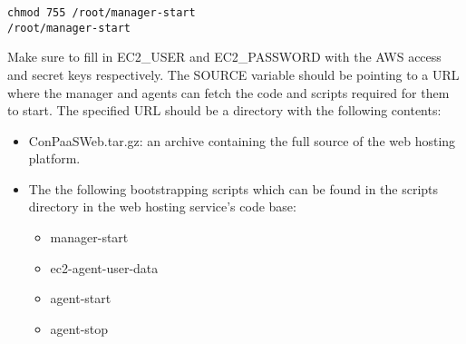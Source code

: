 \documentclass[12pt]{article}
\newenvironment{framedbox}[1]%
{\begin{framed}
 \begingroup
 \fontsize{#1}{#1}\selectfont
}
{
 \endgroup
 \end{framed}
}
\begin{document}
\begin{enumerate}
\begin{framedbox}{8pt}
\begin{verbatim}
chmod 755 /root/manager-start
/root/manager-start
\end{verbatim}\end{framedbox}
Make sure to fill in EC2\_USER and EC2\_PASSWORD with the AWS access and secret
keys respectively. The SOURCE variable should be pointing to a URL where the
manager and agents can fetch the code and scripts required for them to start.
The specified URL should be a directory with the following contents:
\begin{itemize}
\item ConPaaSWeb.tar.gz: an archive containing the full source of the web
      hosting platform.
\item The the following bootstrapping scripts which can be found in the scripts
      directory in the web hosting service's code base:
  \begin{itemize}
    \item manager-start
    \item ec2-agent-user-data
    \item agent-start
    \item agent-stop
  \end{itemize}
\end{itemize}



\end{enumerate}
\end{document}
